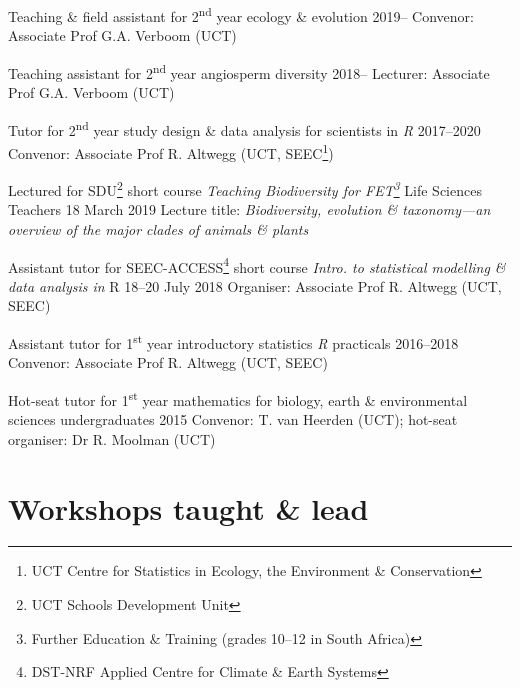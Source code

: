\documentclass[10pt]{article}
\begin{document}
\begin{hangparas}{2em}{1}

Teaching \& field assistant for 2\textsuperscript{nd} year ecology \& evolution
                                                   \hfill {\small 2019--} \break
Convenor: Associate Prof G.A. Verboom (UCT)

Teaching assistant for 2\textsuperscript{nd} year angiosperm diversity
                                                   \hfill {\small 2018--} \break
Lecturer: Associate Prof G.A. Verboom (UCT)

Tutor for 2\textsuperscript{nd} year study design \& data analysis for 
scientists in \textit{R}                       \hfill {\small 2017--2020} \break
Convenor: Associate Prof R. Altwegg (UCT, SEEC\footnote{UCT Centre for 
Statistics in Ecology, the Environment \& Conservation})

Lectured for SDU\footnote{UCT Schools Development Unit} short course 
\textit{Teaching Biodiversity for FET\footnote{Further Education \& Training
(grades 10--12 in South Africa)}} Life Sciences Teachers
                                            \hfill {\small 18 March 2019} \break
Lecture title: \textit{Biodiversity, evolution \& taxonomy---an overview of the 
major clades of animals \& plants}

Assistant tutor for SEEC-ACCESS\footnote{DST-NRF Applied Centre for Climate \&
Earth Systems} short course \textit{Intro. to statistical modelling \& data 
analysis in} R                           \hfill {\small 18--20 July 2018} \break
Organiser: Associate Prof R. Altwegg (UCT, SEEC)

Assistant tutor for 1\textsuperscript{st} year introductory statistics
\textit{R} practicals                          \hfill {\small 2016--2018} \break
Convenor: Associate Prof R. Altwegg (UCT, SEEC)

Hot-seat tutor for 1\textsuperscript{st} year mathematics for biology, earth \& 
environmental sciences undergraduates                \hfill {\small 2015} \break
Convenor: T. van Heerden (UCT); hot-seat organiser: Dr R. Moolman (UCT)

\end{hangparas}

\clearpage

\section*{Workshops taught \& lead} %
\end{document}
